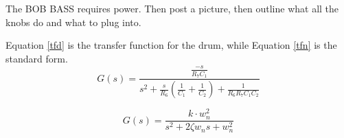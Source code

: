 \documentclass[9pt]{developercv} %
\begin{document}
\hfill %
\begin{minipage}[t]{0.5\textwidth} %
	\vspace{-\baselineskip} %
	\begin{barchart}{5.5}
	\end{barchart}

\end{minipage}


The BOB BASS requires power. Then post a picture, then outline what all the knobs do and what to plug into.



Equation \ref{tfd} is the transfer function for the drum, while Equation \ref{tfn} is the standard form.
\begin{equation}
G(s) = \frac{\frac{-s}{R_7C_1}}{s^2 + \frac{s}{R_6}(\frac{1}{C_1} + \frac{1}{C_2}) + \frac{1}{R_6R_7C_1C_2}}
\label{tfd}
\end{equation}

\begin{equation}
G(s) = \frac{k\cdot w_n^2}{s^2 + 2\zeta w_n s + w_n^2}
\label{tfn}
\end{equation}
\end{document}
